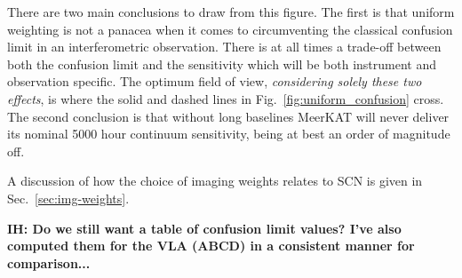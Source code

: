 \documentclass{aa}
\begin{document}
There are two main conclusions to draw from this figure. The first is that uniform weighting is not a panacea when it comes to circumventing the classical confusion limit in an interferometric observation. There is at all times a trade-off between both the confusion limit and the sensitivity which will be both instrument and observation specific. The optimum field of view, \emph{considering solely these two effects}, is where the solid and dashed lines in Fig.~\ref{fig:uniform_confusion} cross. The second conclusion is that without long baselines MeerKAT will never deliver its nominal 5000 hour continuum sensitivity, being at best an order of magnitude off.

A discussion of how the choice of imaging weights relates to SCN is given in Sec.~\ref{sec:img-weights}.

{\bf IH: Do we still want a table of confusion limit values? I've also computed them for the VLA (ABCD) in a consistent manner for comparison...}

\end{document}

